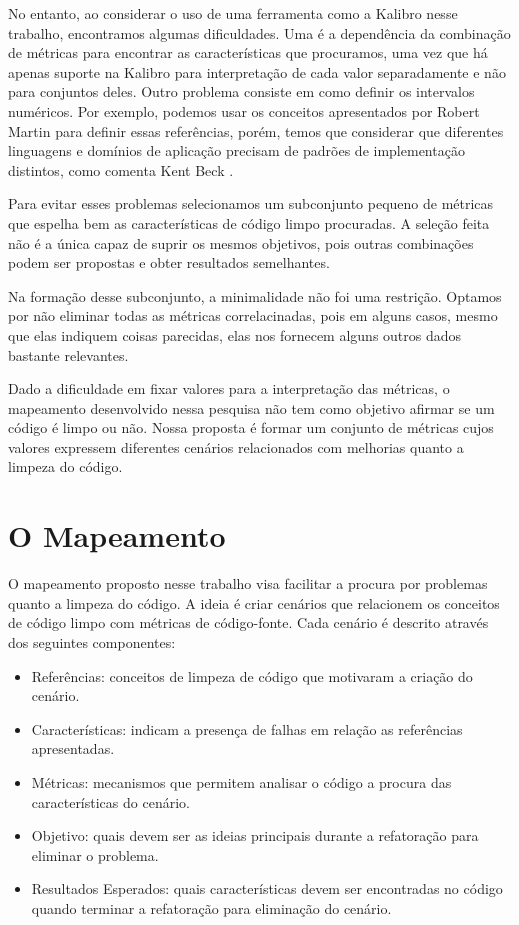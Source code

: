 	No entanto, ao considerar o uso de uma ferramenta como a Kalibro nesse trabalho, encontramos algumas dificuldades. Uma é a dependência da combinação de métricas para encontrar as características que procuramos, uma vez que há apenas suporte na Kalibro para interpretação de cada valor separadamente e não para conjuntos deles. Outro problema consiste em como definir os intervalos numéricos. Por exemplo, podemos usar os conceitos apresentados por Robert Martin \citep{Martin2008} para definir essas referências, porém, temos que considerar que diferentes linguagens e domínios de aplicação precisam de padrões de implementação distintos, como comenta Kent Beck \citep{Beck2007}.	
	
	Para evitar esses problemas selecionamos um subconjunto pequeno de métricas que espelha bem as características de código limpo procuradas. A seleção feita não é a única capaz de suprir os mesmos objetivos, pois outras combinações podem ser propostas e obter resultados semelhantes.
		
	Na formação desse subconjunto, a minimalidade não foi uma restrição. Optamos por não eliminar todas as métricas correlacinadas, pois em alguns casos, mesmo que elas indiquem coisas parecidas, elas nos fornecem alguns outros dados bastante relevantes.
	
	Dado a dificuldade em fixar valores para a interpretação das métricas, o mapeamento desenvolvido nessa pesquisa não tem como objetivo afirmar se um código é limpo ou não. Nossa proposta é formar um conjunto de métricas cujos valores expressem diferentes cenários relacionados com melhorias quanto a limpeza do código.
	
	
\section{O Mapeamento}

	O mapeamento proposto nesse trabalho visa facilitar a procura por problemas quanto a limpeza do código. A ideia é criar cenários que relacionem os conceitos de código limpo com métricas de código-fonte. Cada cenário é descrito através dos seguintes componentes:
	
\begin{itemize}
	\item Referências: conceitos de limpeza de código que motivaram a criação do cenário.
	\item Características: indicam a presença de falhas em relação as referências apresentadas.
	\item Métricas: mecanismos que permitem analisar o código a procura das características do cenário.
	\item Objetivo: quais devem ser as ideias principais durante a refatoração para eliminar o problema.
	\item Resultados Esperados: quais características devem ser encontradas no código quando terminar a refatoração para eliminação do cenário.
\end{itemize}	

